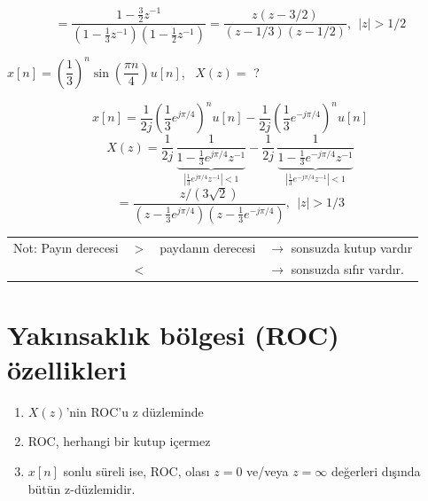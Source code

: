 \documentclass[11pt,a4paper]{article}
\begin{document}
\[ =\frac{1-\frac{3}{2}z^{-1}}{\left(1-\frac{1}{3}z^{-1}\right)\left(1-\frac{1}{2}z^{-1}\right)}
 =\frac{z(z-3/2)}{(z-1/3)(z-1/2)},\ \ |z|>1/2 \]

\begin{center}
\end{center}

\nopagebreak
\begin{ornek}
  $x[n]=\left(\dfrac{1}{3}\right)^{n}\sin\left(\dfrac{\pi n}{4}\right)u[n]$, \ $X(z)=$ ?
\end{ornek}
\[ x[n]=\frac{1}{2j}\left(\frac{1}{3}e^{j\pi/4}\right)^{n}u[n]-\frac{1}{2j}\left(\frac{1}{3}e^{-j\pi/4}\right)^{n}u[n] \]
\[ X(z)=\frac{1}{2j}\,\frac{1}{\underbrace{1-\frac{1}{3}e^{j\pi/4}z^{-1}}_{\left|\frac{1}{3}e^{j\pi/4}z^{-1}\right|<1}}
 -\frac{1}{2j}\,\frac{1}{\underbrace{1-\frac{1}{3}e^{-j\pi/4}z^{-1}}_{\left|\frac{1}{3}e^{-j\pi/4}z^{-1}\right|<1}} \]
\[ =\frac{z/(3\sqrt{2})}{\left(z-\frac{1}{3}e^{j\pi/4}\right)\left(z-\frac{1}{3}e^{-j\pi/4}\right)},\ \ |z|>1/3 \]

\noindent
\begin{tabular}{@{}l@{\ \ }c@{\ \ }l@{\ \ }l@{}}
  Not: Payın derecesi & $>$ & paydanın derecesi & $\to$ sonsuzda kutup vardır\\[2mm]
  & $<$ & & $\to$ sonsuzda sıfır vardır.
\end{tabular}

\section{Yakınsaklık bölgesi (ROC) özellikleri}
\begin{enumerate}[label=\arabic*), leftmargin=2em, itemsep=6pt]
  \item $X(z)$'nin ROC'u z düzleminde
  \item ROC, herhangi bir kutup içermez
  \item $x[n]$ sonlu süreli ise, ROC, olası $z=0$ ve/veya $z=\infty$ değerleri dışında bütün z-düzlemidir.
\end{enumerate}
\end{document}
